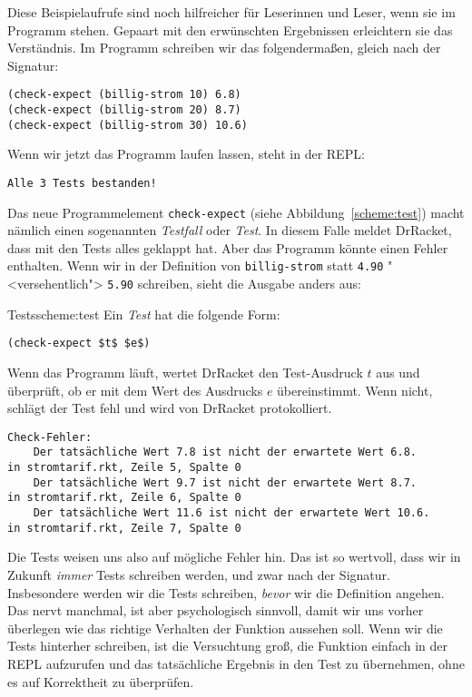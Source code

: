 Diese Beispielaufrufe sind noch hilfreicher für Leserinnen und Leser,
wenn sie im Programm stehen.  Gepaart mit den erwünschten Ergebnissen
erleichtern sie das Verständnis.  Im Programm schreiben wir
das folgendermaßen, gleich nach der Signatur:
%
\begin{lstlisting}
(check-expect (billig-strom 10) 6.8)
(check-expect (billig-strom 20) 8.7)
(check-expect (billig-strom 30) 10.6)
\end{lstlisting}
%
Wenn wir jetzt das Programm laufen lassen, steht in der REPL:
%
\begin{verbatim}
Alle 3 Tests bestanden!
\end{verbatim}
%
Das neue Programmelement
\lstinline{check-expect} (siehe
Abbildung~\ref{scheme:test}) macht
nämlich einen sogenannten \textit{Testfall} oder \textit{Test}.  In diesem Falle
meldet DrRacket, dass mit den Tests alles geklappt hat.  Aber das
Programm könnte einen Fehler enthalten.  Wenn wir in der Definition
von \lstinline{billig-strom} statt \lstinline{4.90} "<versehentlich">
\lstinline{5.90} schreiben, sieht die Ausgabe anders aus:
%
\begin{feature}{Tests}{scheme:test}
  Ein \textit{Test} hat die folgende Form:
\begin{lstlisting}
(check-expect $t$ $e$)
\end{lstlisting}
%
Wenn das Programm läuft, wertet DrRacket den Test-Ausdruck $t$ aus und
überprüft, ob er mit dem Wert des Ausdrucks $e$ übereinstimmt.  Wenn
nicht, schlägt der Test fehl und wird von DrRacket protokolliert.
\end{feature}
%
\begin{verbatim}
Check-Fehler:
	Der tatsächliche Wert 7.8 ist nicht der erwartete Wert 6.8.
in stromtarif.rkt, Zeile 5, Spalte 0 
	Der tatsächliche Wert 9.7 ist nicht der erwartete Wert 8.7.
in stromtarif.rkt, Zeile 6, Spalte 0 
	Der tatsächliche Wert 11.6 ist nicht der erwartete Wert 10.6.
in stromtarif.rkt, Zeile 7, Spalte 0 
\end{verbatim}
%
Die Tests weisen uns also auf mögliche Fehler hin.  Das ist so
wertvoll, dass wir in Zukunft \emph{immer} Tests schreiben werden, und
zwar nach der Signatur.  Insbesondere werden wir die Tests schreiben,
\emph{bevor} wir die Definition angehen.  Das nervt manchmal, ist aber
psychologisch sinnvoll, damit wir uns vorher überlegen wie das
richtige Verhalten der Funktion aussehen soll.  Wenn wir die Tests
hinterher schreiben, ist die Versuchtung groß, die Funktion einfach in
der REPL aufzurufen und das tatsächliche Ergebnis in den Test zu
übernehmen, ohne es auf Korrektheit zu überprüfen.

